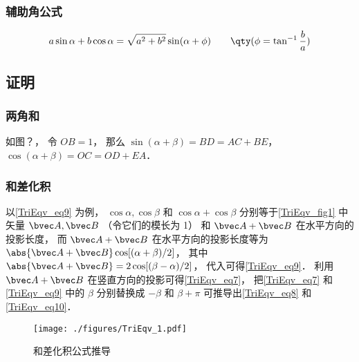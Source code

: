 \subsubsection{辅助角公式}
\begin{equation}
a\sin \alpha + b\cos \alpha = \sqrt{a^2+b^2}\sin(\alpha + \phi) \qquad \qty(\phi = \tan^{-1}\frac{b}{a})
\end{equation}

\subsection{证明}
\subsubsection{两角和}
如图？， 令 $OB = 1$， 那么 $\sin(\alpha+\beta) = BD = AC + BE$， $\cos(\alpha+\beta) = OC = OD + EA$．

\subsubsection{和差化积}
以\autoref{TriEqv_eq9} 为例， $\cos \alpha, \cos \beta$ 和 $\cos \alpha + \cos \beta$ 分别等于\autoref{TriEqv_fig1} 中矢量 $\bvec A, \bvec B$ （令它们的模长为 1） 和 $\bvec A + \bvec B$ 在水平方向的投影长度， 而 $\bvec A + \bvec B$ 在水平方向的投影长度等为 $\abs{\bvec A + \bvec B}\cos[(\alpha+\beta)/2]$， 其中 $\abs{\bvec A + \bvec B} = 2\cos [(\beta-\alpha)/2]$， 代入可得\autoref{TriEqv_eq9}． 利用 $\bvec A + \bvec B$ 在竖直方向的投影可得\autoref{TriEqv_eq7}， 把\autoref{TriEqv_eq7} 和\autoref{TriEqv_eq9} 中的 $\beta$ 分别替换成 $-\beta$ 和 $\beta+\pi$ 可推导出\autoref{TriEqv_eq8} 和\autoref{TriEqv_eq10}．
\begin{figure}[ht]
\centering
\texttt{[image: ./figures/TriEqv\_1.pdf]}
\caption{和差化积公式推导} \label{TriEqv_fig1}
\end{figure}
